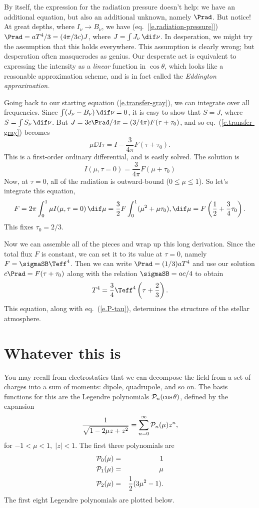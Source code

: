 By itself, the expression for the radiation pressure doesn't help: we have an additional equation, but also an additional unknown, namely $\Prad$. But notice! At great depths, where $I_{\nu}\to B_{\nu}$, we have (eq.~[\ref{e.radiation-pressure}]) $\Prad = aT^{4}/3 = (4\pi/3c)J$, where $J=\int J_{\nu}\,\dif\nu$. In desperation, we might try the assumption that this holds everywhere. This assumption is clearly wrong; but desperation often masquerades as genius. Our desperate act is equivalent to expressing the intensity as a \emph{linear} function in $\cos\theta$, which looks like a reasonable approximation scheme, and is in fact called the \emph{Eddington approximation.}

Going back to our starting equation (\ref{e.transfer-gray}), we can integrate over all frequencies. Since $\int(J_{\nu}-B_{\nu})\,\dif\nu = 0$, it is easy to show that $S = J$, where $S=\int S_{\nu}\,\dif\nu$. But $J = 3c\Prad/4\pi = (3/4\pi)F(\tau + \tau_{0})$, and so eq.~(\ref{e.transfer-gray}) becomes
\[
	\mu \DD{I}{\tau} = I -\frac{3}{4\pi} F (\tau +\tau_{0}).
\]
This is a first-order ordinary differential, and is easily solved. The solution is
\[
	I(\mu,\tau=0) = \frac{3}{4\pi}F(\mu + \tau_{0})
\]
Now, at $\tau=0$, all of the radiation is outward-bound ($0\le\mu\le 1$). So let's integrate this equation,
\[
	F = 2\pi\int_{0}^{1}\mu I(\mu,\tau=0)\,\dif\mu = \frac{3}{2}F\int_{0}^{1} (\mu^{2} + \mu\tau_{0}),\dif\mu = F\left(\frac{1}{2} + \frac{3}{4}\tau_{0}\right).
\]
This fixes $\tau_{0} = 2/3$.

Now we can assemble all of the pieces and wrap up this long derivation. Since the total flux $F$ is constant, we can set it to its value at $\tau=0$, namely $F = \sigmaSB\Teff^{4}$. Then we can write $\Prad = (1/3) a T^{4}$ and use our solution $c\Prad = F(\tau+\tau_{0})$ along with the relation $\sigmaSB = ac/4$ to obtain
\begin{equation}\label{e.T-tau}
T^{4} = \frac{3}{4}\Teff^{4}\left(\tau + \frac{2}{3}\right).
\end{equation}
This equation, along with eq.~(\ref{e.P-tau}), determines the structure of the stellar atmosphere.

\section{Whatever this is}
You may recall from electrostatics that we can decompose the field from a set of charges into a sum of moments: dipole, quadrupole, and so on. The basis functions for this are the Legendre polynomials $\mathcal{P}_{n}(\cos\theta)$, defined by the expansion
\begin{equation}
	\frac{1}{\sqrt{1 - 2\mu z + z^{2}}} = \sum_{n=0}^{\infty}\mathcal{P}_{n}(\mu)z^{n},
\end{equation}
for $-1<\mu<1,\;|z| < 1$. The first three polynomials are
\begin{eqnarray}
	\mathcal{P}_{0}(\mu) &=& 1 \nonumber\\
	\mathcal{P}_{1}(\mu) &=& \mu \nonumber\\
	\mathcal{P}_{2}(\mu) &=& \frac{1}{2}(3\mu^{2}-1).
\end{eqnarray}
The first eight Legendre polynomials are plotted below.

